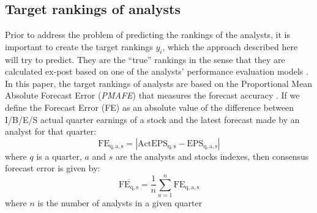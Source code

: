 \documentclass{article}\usepackage[]{graphicx}\usepackage[]{color}
\begin{document}



\subsection{Target  rankings of analysts}
Prior to address the problem of predicting the rankings of the analysts, it is important to create the target rankings $y_i$, which the approach described here will try to predict. They are the ``true'' rankings in the sense that they are calculated ex-post based on one of the analysts' performance evaluation models \citep{clement1999,brown2001,creamer2009}. In this paper, the target rankings of analysts are based on the Proportional  Mean Absolute Forecast Error (\textit{PMAFE}) that measures the forecast accuracy \citep{brown2001}. If we define the  Forecast Error  (FE) as an absolute value of the difference between I/B/E/S actual quarter earnings of a stock and the latest forecast made by an analyst for that quarter: 
\begin{equation}
\mathrm{FE_{q,a,s}}=|\mathrm{ActEPS_{q,s}}-\mathrm{EPS_{q,a,s}}|
\end{equation}
where $q$ is a quarter, $a$ and $s$ are the analysts and stocks indexes, then consensus forecast error is given by:
\begin{equation}
\mathrm{\overline{FE_{q,s}}}=\frac{1}{n}\sum_{a=1}^n \mathrm{FE_{q,a,s}}
\end{equation}
where $n$ is the number of analysts in a given quarter 
\end{document}
